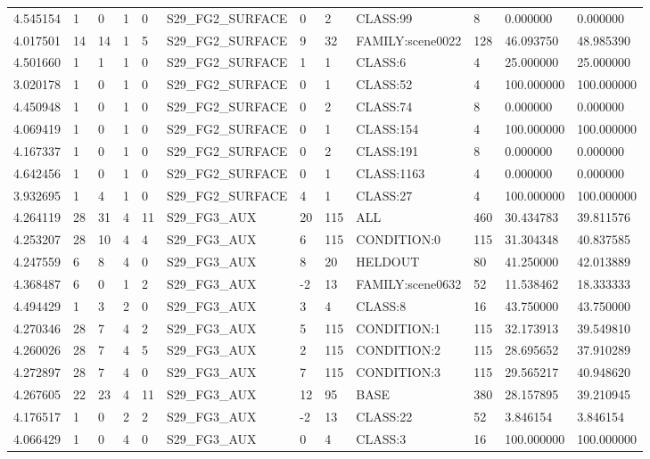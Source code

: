 \begin{tabular}{llllllllllll}
4.545154 & 1 & 0 & 1 & 0 & S29\_FG2\_SURFACE & 0 & 2 & CLASS:99 & 8 & 0.000000 & 0.000000 \\
4.017501 & 14 & 14 & 1 & 5 & S29\_FG2\_SURFACE & 9 & 32 & FAMILY:scene0022 & 128 & 46.093750 & 48.985390 \\
4.501660 & 1 & 1 & 1 & 0 & S29\_FG2\_SURFACE & 1 & 1 & CLASS:6 & 4 & 25.000000 & 25.000000 \\
3.020178 & 1 & 0 & 1 & 0 & S29\_FG2\_SURFACE & 0 & 1 & CLASS:52 & 4 & 100.000000 & 100.000000 \\
4.450948 & 1 & 0 & 1 & 0 & S29\_FG2\_SURFACE & 0 & 2 & CLASS:74 & 8 & 0.000000 & 0.000000 \\
4.069419 & 1 & 0 & 1 & 0 & S29\_FG2\_SURFACE & 0 & 1 & CLASS:154 & 4 & 100.000000 & 100.000000 \\
4.167337 & 1 & 0 & 1 & 0 & S29\_FG2\_SURFACE & 0 & 2 & CLASS:191 & 8 & 0.000000 & 0.000000 \\
4.642456 & 1 & 0 & 1 & 0 & S29\_FG2\_SURFACE & 0 & 1 & CLASS:1163 & 4 & 0.000000 & 0.000000 \\
3.932695 & 1 & 4 & 1 & 0 & S29\_FG2\_SURFACE & 4 & 1 & CLASS:27 & 4 & 100.000000 & 100.000000 \\
4.264119 & 28 & 31 & 4 & 11 & S29\_FG3\_AUX & 20 & 115 & ALL & 460 & 30.434783 & 39.811576 \\
4.253207 & 28 & 10 & 4 & 4 & S29\_FG3\_AUX & 6 & 115 & CONDITION:0 & 115 & 31.304348 & 40.837585 \\
4.247559 & 6 & 8 & 4 & 0 & S29\_FG3\_AUX & 8 & 20 & HELDOUT & 80 & 41.250000 & 42.013889 \\
4.368487 & 6 & 0 & 1 & 2 & S29\_FG3\_AUX & -2 & 13 & FAMILY:scene0632 & 52 & 11.538462 & 18.333333 \\
4.494429 & 1 & 3 & 2 & 0 & S29\_FG3\_AUX & 3 & 4 & CLASS:8 & 16 & 43.750000 & 43.750000 \\
4.270346 & 28 & 7 & 4 & 2 & S29\_FG3\_AUX & 5 & 115 & CONDITION:1 & 115 & 32.173913 & 39.549810 \\
4.260026 & 28 & 7 & 4 & 5 & S29\_FG3\_AUX & 2 & 115 & CONDITION:2 & 115 & 28.695652 & 37.910289 \\
4.272897 & 28 & 7 & 4 & 0 & S29\_FG3\_AUX & 7 & 115 & CONDITION:3 & 115 & 29.565217 & 40.948620 \\
4.267605 & 22 & 23 & 4 & 11 & S29\_FG3\_AUX & 12 & 95 & BASE & 380 & 28.157895 & 39.210945 \\
4.176517 & 1 & 0 & 2 & 2 & S29\_FG3\_AUX & -2 & 13 & CLASS:22 & 52 & 3.846154 & 3.846154 \\
4.066429 & 1 & 0 & 4 & 0 & S29\_FG3\_AUX & 0 & 4 & CLASS:3 & 16 & 100.000000 & 100.000000 \\

\end{tabular}
